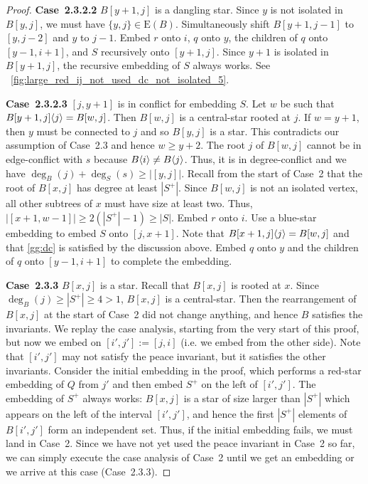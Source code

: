 \documentclass[11pt,a4paper,colorlinks=true,urlcolor=blue,citecolor=red]{article}
\theoremstyle{plain}
\newcommand{\case}[1]{\par\vspace{.5\baselineskip}\noindent\textbf{\sffamily Case~#1}}
\newcommand{\EB}{\mathrm{E}(B)}
\begin{document}
\begin{proof}
  \case{2.3.2.2} $B[y+1,j]$ is a dangling star. Since $y$ is not
  isolated in $B[y,j]$, we must have $\{y,j\}\in\EB$. Simultaneously
  shift $B[y+1,j-1]$ to $[y,j-2]$ and $y$ to $j-1$. Embed $r$ onto $i$,
  $q$ onto $y$, the children of $q$ onto $[y-1,i+1]$, and $S$
  recursively onto $[y+1,j]$. Since $y+1$ is isolated in $B[y+1,j]$, the
  recursive embedding of $S$ always works. See
  \figurename~\ref{fig:large_red_ij_not_used_dc_not_isolated_5}.

  \case{2.3.2.3} $[j,y+1]$ is in conflict for embedding $S$. Let
  $w$ be such that $B{[y+1,j]}\langle{j}\rangle=B[w,j]$. Then $B[w,j]$ is a
  central-star rooted at $j$. If $w=y+1$, then $y$ must be connected to
  $j$ and so $B[y,j]$ is a star. This contradicts our assumption of
  Case~2.3 and hence $w\geq y+2$. The root $j$ of $B[w,j]$ cannot be in
  edge-conflict with $s$ because $B\langle{i}\rangle\neq B\langle{j}\rangle$. Thus, it is
  in degree-conflict and we have $\deg_B(j)+\deg_S(s)\geq|[y,j]|$.
  Recall from the start of Case~2 that the root of $B[x,j]$ has degree
  at least $|S^+|$. Since $B[w,j]$ is not an isolated vertex, all other
  subtrees of $x$ must have size at least two. Thus,
  $|[x+1,w-1]|\geq2(|S^+|-1)\geq|S|$. Embed $r$ onto $i$. Use a
  blue-star embedding to embed $S$ onto $[j,x+1]$. Note that
  $B{[x+1,j]}\langle{j}\rangle=B[w,j]$ and that \ref{gg:dc} is satisfied by the
  discussion above. Embed $q$ onto $y$ and the children of $q$ onto
  $[y-1,i+1]$ to complete the embedding.

  \case{2.3.3} $B[x,j]$ is a star. Recall that $B[x,j]$ is rooted at
  $x$. Since $\deg_B(j)\geq|S^+|\geq4>1$, $B[x,j]$ is a central-star.
  Then the rearrangement of $B[x,j]$ at the start of Case~2 did not
  change anything, and hence $B$ satisfies the invariants. We replay the
  case analysis, starting from the very start of this proof, but now we
  embed on $[i',j']:=[j,i]$ (i.e. we embed from the other side). Note
  that $[i',j']$ may not satisfy the peace invariant, but it satisfies
  the other invariants. Consider the initial embedding in the proof,
  which performs a red-star embedding of $Q$ from $j'$ and then
  embed $S^+$ on the left of $[i',j']$. The embedding of $S^+$ always
  works: $B[x,j]$ is a star of size larger than $|S^+|$ which appears on
  the left of the interval $[i',j']$, and hence the first $|S^+|$
  elements of $B[i',j']$ form an independent set. Thus, if the initial
  embedding fails, we must land in Case~2. Since we have not yet used
  the peace invariant in Case~2 so far, we can simply execute the case
  analysis of Case~2 until we get an embedding or we arrive at this case
  (Case~2.3.3).


\end{proof}
\end{document}
